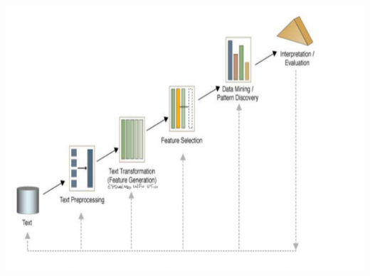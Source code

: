 \documentclass{report}
\begin{document}
	\begin{center}
		\includegraphics[scale=0.6]{assets/textminingprocess.png}
	\end{center}
\end{document}
